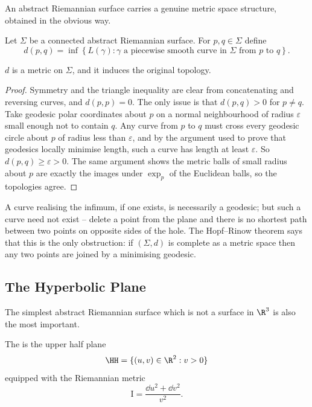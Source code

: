 An abstract Riemannian surface carries a genuine metric space structure, obtained in the obvious way.

\begin{definition}
    Let $\Sigma$ be a connected abstract Riemannian surface. For $p, q \in \Sigma$ define
    $$
    d(p,q) = \inf\left\{L(\gamma) : \gamma \text{ a piecewise smooth curve in } \Sigma \text{ from } p \text{ to } q\right\}.
    $$
\end{definition}

\begin{proposition}
    $d$ is a metric on $\Sigma$, and it induces the original topology.
\end{proposition}
\begin{proof}
    Symmetry and the triangle inequality are clear from concatenating and reversing curves, and $d(p,p) = 0$. The only issue is that $d(p,q) > 0$ for $p \neq q$. Take geodesic polar coordinates about $p$ on a normal neighbourhood of radius $\varepsilon$ small enough not to contain $q$. Any curve from $p$ to $q$ must cross every geodesic circle about $p$ of radius less than $\varepsilon$, and by the argument used to prove that geodesics locally minimise length, such a curve has length at least $\varepsilon$. So $d(p,q) \geq \varepsilon > 0$. The same argument shows the metric balls of small radius about $p$ are exactly the images under $\exp_p$ of the Euclidean balls, so the topologies agree.
\end{proof}

\begin{remark}
    A curve realising the infimum, if one exists, is necessarily a geodesic; but such a curve need not exist -- delete a point from the plane and there is no shortest path between two points on opposite sides of the hole. The Hopf--Rinow theorem says that this is the only obstruction: if $(\Sigma, d)$ is complete as a metric space then any two points are joined by a minimising geodesic.
\end{remark}

\subsection{The Hyperbolic Plane}

The simplest abstract Riemannian surface which is not a surface in $\R^3$ is also the most important.

\begin{definition}
    The  is the upper half plane
    $$
    \HH = \{(u,v) \in \R^2 : v > 0\}
    $$
    equipped with the Riemannian metric
    $$
    \mathrm{I} = \frac{\dd u^2 + \dd v^2}{v^2}.
    $$
\end{definition}

